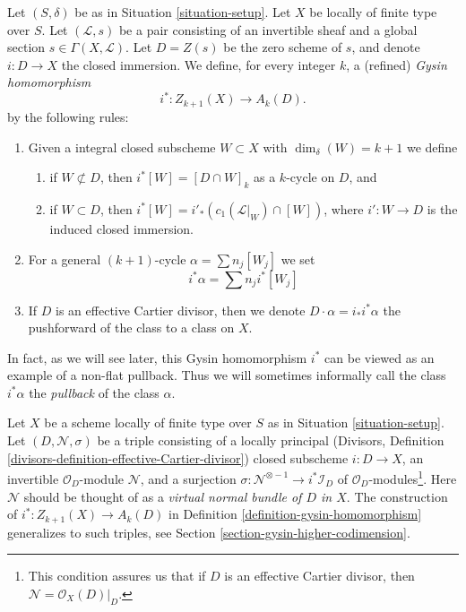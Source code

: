 \begin{definition}
\label{definition-gysin-homomorphism}
Let $(S, \delta)$ be as in Situation \ref{situation-setup}.
Let $X$ be locally of finite type over $S$.
Let $(\mathcal{L}, s)$ be a pair consisting of an invertible
sheaf and a global section $s \in \Gamma(X, \mathcal{L})$.
Let $D = Z(s)$ be the zero scheme of $s$, and
denote $i : D \to X$ the closed immersion.
We define, for every integer $k$, a (refined) {\it Gysin homomorphism}
$$
i^* : Z_{k + 1}(X) \to A_k(D).
$$
by the following rules:
\begin{enumerate}
\item Given a integral closed subscheme $W \subset X$ with
$\dim_\delta(W) = k + 1$ we define
\begin{enumerate}
\item if $W \not \subset D$, then $i^*[W] = [D \cap W]_k$ as a
$k$-cycle on $D$, and
\item if $W \subset D$, then
$i^*[W] = i'_*(c_1(\mathcal{L}|_W) \cap [W])$,
where $i' : W \to D$ is the induced closed immersion.
\end{enumerate}
\item For a general $(k + 1)$-cycle $\alpha = \sum n_j[W_j]$
we set
$$
i^*\alpha = \sum n_j i^*[W_j]
$$
\item If $D$ is an effective Cartier divisor, then we denote
$D \cdot \alpha = i_*i^*\alpha$ the pushforward of
the class to a class on $X$.
\end{enumerate}
\end{definition}

\noindent
In fact, as we will see later, this Gysin homomorphism $i^*$ can be viewed
as an example of a non-flat pullback. Thus we will sometimes informally
call the class $i^*\alpha$ the {\it pullback} of the class $\alpha$.

\begin{remark}
\label{remark-generalize-to-virtual}
Let $X$ be a scheme locally of finite type over $S$ as in
Situation \ref{situation-setup}. Let $(D, \mathcal{N}, \sigma)$
be a triple consisting of a locally principal (Divisors, Definition
\ref{divisors-definition-effective-Cartier-divisor}) closed subscheme
$i : D \to X$, an invertible $\mathcal{O}_D$-module $\mathcal{N}$, and
a surjection $\sigma : \mathcal{N}^{\otimes -1} \to i^*\mathcal{I}_D$
of $\mathcal{O}_D$-modules\footnote{This condition assures us that if
$D$ is an effective Cartier divisor, then $\mathcal{N} = \mathcal{O}_X(D)|_D$.}.
Here $\mathcal{N}$ should be thought of as
a {\it virtual normal bundle of $D$ in $X$}. The construction of
$i^* : Z_{k + 1}(X) \to A_k(D)$ in
Definition \ref{definition-gysin-homomorphism}
generalizes to such triples, see
Section \ref{section-gysin-higher-codimension}.
\end{remark}

